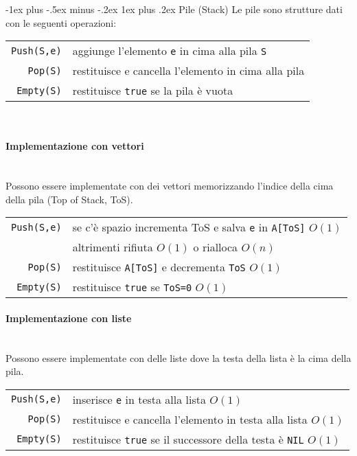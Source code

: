 \documentclass[10pt,landscape]{article}
\makeatletter
\renewcommand{\subsubsection}{\@startsection{subsubsection}{3}{0mm}%
                                {-1ex plus -.5ex minus -.2ex}%
                                {1ex plus .2ex}%
                                {\normalfont\normalsize\bfseries}}
\newcommand{\myparagraph}[1]{\paragraph{#1}\mbox{}\\ [5pt]}
\makeatother
\begin{document}
\begin{multicols*}{4}
                \subsubsection{Pile (Stack)}
                Le pile sono strutture dati con le seguenti operazioni:\\[3pt]
                \begin{tabular}{rl}
                        \verb|Push(S,e)| & aggiunge l'elemento \verb|e| in cima alla pila \verb|S| \\
                        \verb|Pop(S)|    & restituisce e cancella l'elemento in cima alla pila     \\
                        \verb|Empty(S)|  & restituisce \verb|true| se la pila è vuota              \\
                \end{tabular}\\ [3pt]
                \myparagraph{Implementazione con vettori}
                Possono essere implementate con dei vettori memorizzando l'indice della cima della pila (Top of Stack, ToS). \\ [3pt]
                \begin{tabular}{rl}
                        \verb|Push(S,e)| & se c'è spazio incrementa ToS e salva \verb|e| in \verb|A[ToS]|  $O(1)$ \\
                                         & altrimenti rifiuta $O(1)$ o rialloca $O(n)$                            \\
                        \verb|Pop(S)|    & restituisce \verb|A[ToS]| e decrementa \verb|ToS|               $O(1)$ \\
                        \verb|Empty(S)|  & restituisce \verb|true| se \verb|ToS=0|                         $O(1)$ \\
                \end{tabular}
                \myparagraph{Implementazione con liste}
                Possono essere implementate con delle liste dove la testa della lista è la cima della pila. \\ [3pt]
                \begin{tabular}{rl}
                        \verb|Push(S,e)| & inserisce \verb|e| in testa alla lista                             $O(1)$ \\
                        \verb|Pop(S)|    & restituisce e cancella l'elemento in testa alla lista              $O(1)$ \\
                        \verb|Empty(S)|  & restituisce \verb|true| se il successore della testa è \verb|NIL| $O(1)$  \\
                \end{tabular}


\end{multicols*}
\end{document}
